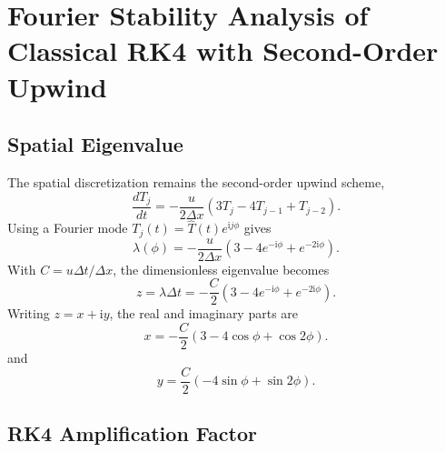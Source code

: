 
\section{Fourier Stability Analysis of Classical RK4 with Second-Order Upwind}
\label{app:rk4-upwind-stability}

\subsection{Spatial Eigenvalue}
\label{app:rk4-upwind-eigenvalue}

The spatial discretization remains the second-order upwind scheme,
\begin{equation}
    \frac{dT_j}{dt}
    =-\frac{u}{2\Delta x}
    \left(3T_j-4T_{j-1}+T_{j-2}\right).
    \label{eq:app-rk4-upwind-semidiscrete}
\end{equation}
Using a Fourier mode $T_j(t)=\hat{T}(t)e^{\mathrm{i}j\phi}$ gives
\begin{equation}
    \lambda(\phi)=-\frac{u}{2\Delta x}
    \left(3-4e^{-\mathrm{i}\phi}+e^{-2\mathrm{i}\phi}\right).
    \label{eq:app-rk4-upwind-lambda}
\end{equation}
With $C=u\Delta t/\Delta x$, the dimensionless eigenvalue becomes
\begin{equation}
    \boxed{
    z=\lambda\Delta t=-\frac{C}{2}
    \left(3-4e^{-\mathrm{i}\phi}+e^{-2\mathrm{i}\phi}\right)
    }.
    \label{eq:app-rk4-upwind-z}
\end{equation}
Writing $z=x+\mathrm{i}y$, the real and imaginary parts are
\begin{equation}
    \boxed{
    x=-\frac{C}{2}\left(3-4\cos\phi+\cos 2\phi\right)
    }.
    \label{eq:app-rk4-upwind-x}
\end{equation}
and
\begin{equation}
    \boxed{
    y=\frac{C}{2}\left(-4\sin\phi+\sin 2\phi\right)
    }.
    \label{eq:app-rk4-upwind-y}
\end{equation}

\subsection{RK4 Amplification Factor}
\label{app:rk4-upwind-amplification}

